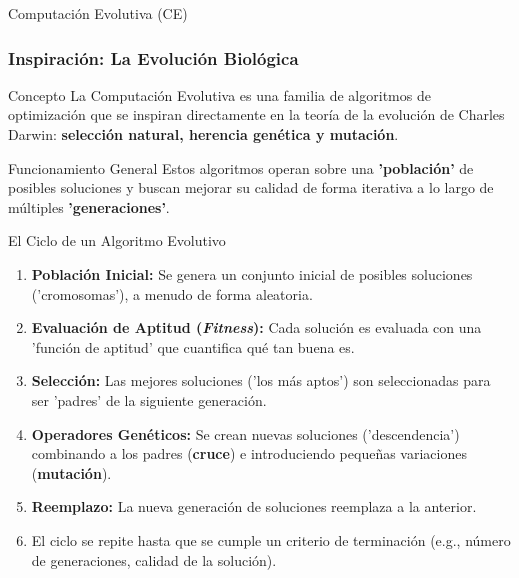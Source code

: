 \documentclass[aspectratio=169,xcolor=dvipsnames]{beamer}
\begin{document}
\begin{frame}{Computación Evolutiva (CE)}
    \frametitle{Inspiración: La Evolución Biológica}
    \begin{block}{Concepto}
    La Computación Evolutiva es una familia de algoritmos de optimización que se inspiran directamente en la teoría de la evolución de Charles Darwin: \textbf{selección natural, herencia genética y mutación}.
    \end{block}
    
    \begin{alertblock}{Funcionamiento General}
    Estos algoritmos operan sobre una \textbf{'población'} de posibles soluciones y buscan mejorar su calidad de forma iterativa a lo largo de múltiples \textbf{'generaciones'}.
    \end{alertblock}
\end{frame}


\begin{frame}{El Ciclo de un Algoritmo Evolutivo}
    \begin{enumerate}
        \item \textbf{Población Inicial:} Se genera un conjunto inicial de posibles soluciones ('cromosomas'), a menudo de forma aleatoria. \pause
        
        \item \textbf{Evaluación de Aptitud (\textit{Fitness}):} Cada solución es evaluada con una 'función de aptitud' que cuantifica qué tan buena es. \pause
        
        \item \textbf{Selección:} Las mejores soluciones ('los más aptos') son seleccionadas para ser 'padres' de la siguiente generación. \pause
        
        \item \textbf{Operadores Genéticos:} Se crean nuevas soluciones ('descendencia') combinando a los padres (\textbf{cruce}) e introduciendo pequeñas variaciones (\textbf{mutación}). \pause
        
        \item \textbf{Reemplazo:} La nueva generación de soluciones reemplaza a la anterior. \pause
        
        \item El ciclo se repite hasta que se cumple un criterio de terminación (e.g., número de generaciones, calidad de la solución).
    \end{enumerate}
\end{frame}
\end{document}
